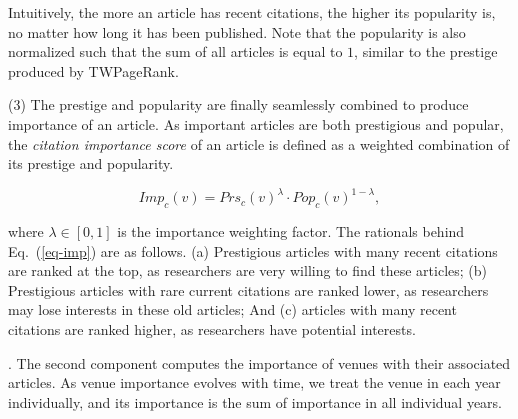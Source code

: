 
Intuitively, the more an article has recent citations, the higher its popularity is, no matter how long it has been published.
%
Note that the popularity is also normalized such that the sum of  all articles is equal to $1$, similar to the prestige produced by TWPageRank.

\sstab(3) The prestige and popularity are finally seamlessly combined to produce importance of an article. As important articles are both prestigious and popular, the {\em citation importance score} of an article is defined as a weighted combination of its prestige and popularity.
\begin{small}
\begin{equation}\label{eq-imp}
Imp_c(v) = Prs_c(v)^\lambda \cdot Pop_c(v)^{1-\lambda},
\end{equation}
\end{small}
\noindent where $\lambda \in [0,1]$ is the importance weighting factor.
The rationals behind Eq.~(\ref{eq-imp}) are as follows. (a) Prestigious articles with many recent citations are ranked at the top, as researchers are very willing to find these articles; (b) Prestigious articles with rare current citations are ranked lower, as researchers may lose interests in these old articles; And (c) articles with many recent citations are ranked higher, as researchers have potential interests.



.
The second component computes the importance of venues with their associated articles. As venue importance evolves with time, we treat the venue in each year individually, and its importance is the sum of importance in all individual years.


